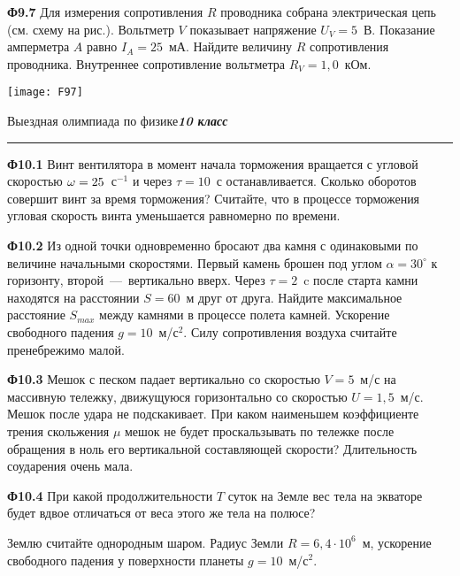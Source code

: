 \documentclass[12pt, a4paper, usenames]{article}
\newcommand*{\hm}[1]{#1\nobreak\discretionary{}%
{\hbox{$\mathsurround=0pt #1$}}{}}
\begin{document}
\bigskip

\parbox[b][2.7cm][t]{115mm}{{\bf Ф9.7} Для измерения сопротивления $R$ проводника собрана электрическая цепь (см. схему на рис.). Вольтметр $V$ показывает напряжение $U_V = 5$~В. Показание амперметра $A$ равно $I_A = 25$~мА. Найдите величину $R$ сопротивления проводника. Внутреннее сопротивление вольтметра $R_V = 1{,}0$~кОм. 
\medskip}
\hfill
\parbox[b][2.7cm][t]{65mm}{
\texttt{[image: F97]}} 

\bigskip



\newpage
\begin{center}
Выездная олимпиада по физике\hfill\textit{\bf 10 класс}
\hrule\medskip
\end{center}

{\bf Ф10.1} Винт вентилятора в момент начала торможения вращается с угловой скоростью $\omega \hm= 25$~с$^{-1}$ и через $\tau = 10$~с останавливается. Сколько оборотов совершит винт за время торможения? Считайте, что в процессе торможения угловая скорость винта уменьшается равномерно по времени.   

\bigskip

{\bf Ф10.2} Из одной точки одновременно бросают два камня с одинаковыми по величине начальными скоростями. Первый камень брошен под углом $\alpha = 30^\circ$ к горизонту, второй~---~вертикально вверх. Через $\tau = 2$~c после старта камни находятся на расстоянии $S = 60$~м друг от друга. Найдите максимальное расстояние $S_{max}$ между камнями в процессе полета камней. Ускорение свободного падения $g = 10$~м/с$^2$. Силу сопротивления воздуха считайте пренебрежимо малой. 

\bigskip

{\bf Ф10.3} Мешок с песком падает вертикально со скоростью $V = 5$~м/с на массивную тележку, движущуюся горизонтально со скоростью $U = 1{,}5$~м/с. Мешок после удара не подскакивает. При каком наименьшем коэффициенте трения скольжения $\mu$ мешок не будет проскальзывать по тележке после обращения в ноль его вертикальной составляющей скорости? Длительность соударения очень мала. 

\bigskip

{\bf Ф10.4} При какой продолжительности $T$ суток на Земле вес тела на экваторе будет вдвое отличаться от веса этого же тела на полюсе? 

Землю считайте однородным шаром. Радиус Земли $R = 6{,}4\cdot 10^6$~м, ускорение свободного падения у поверхности планеты $g = 10$~м/с$^2$.
\end{document}

